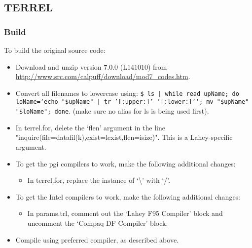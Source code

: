 \documentclass[10pt,a4paper]{article}
\begin{document}
\subsection{TERREL}
\subsubsection{Build}
To build the original source code:
\begin{itemize}
\item Download and unzip version 7.0.0 (L141010) from \url{http://www.src.com/calpuff/download/mod7_codes.htm}.
\item Convert all filenames to lowercase using: \texttt{\$ ls | while read upName; do loName=`echo "\${upName}" | tr '[:upper:]' '[:lower:]'`; mv "\$upName" "\$loName"; done}. (make sure no alias for ls is being used first).
\item In terrel.for, delete the `flen' argument in the line "inquire(file=datafil(k),exist=lexist,flen=isize)". This is a Lahey-specific argument.
\item To get the pgi compilers to work, make the following additional changes:
\begin{itemize}
\item In terrel.for, replace the instance of `\textbackslash' with `/'.
\end{itemize}
\item To get the Intel compilers to work, make the following additional changes:
\begin{itemize}
\item In params.trl, comment out the `Lahey F95 Compiler' block and uncomment the `Compaq DF Compiler' block.
\end{itemize}
\item Compile using preferred compiler, as described above.
\end{itemize}
\end{document}
